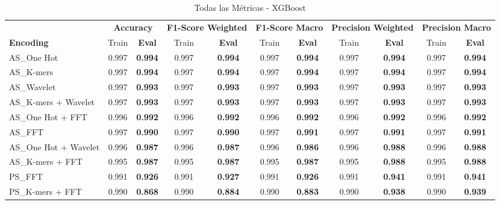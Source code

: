 \begin{table*}[htbp]
\centering
\caption{Todas las Métricas - XGBoost}
\label{tab:xgboost_complete}
\scriptsize
\begin{tabular}{lcccccccccc}
\toprule
& \multicolumn{2}{c}{\textbf{Accuracy}} & \multicolumn{2}{c}{\textbf{F1-Score Weighted}} & \multicolumn{2}{c}{\textbf{F1-Score Macro}} & \multicolumn{2}{c}{\textbf{Precision Weighted}} & \multicolumn{2}{c}{\textbf{Precision Macro}} \\
\cmidrule(lr){2-3} \cmidrule(lr){4-5} \cmidrule(lr){6-7} \cmidrule(lr){8-9} \cmidrule(lr){10-11}
\textbf{Encoding} & Train & \textbf{Eval} & Train & \textbf{Eval} & Train & \textbf{Eval} & Train & \textbf{Eval} & Train & \textbf{Eval} \\
\midrule
AS\_One Hot & 0.997 & \textbf{0.994} & 0.997 & \textbf{0.994} & 0.997 & \textbf{0.994} & 0.997 & \textbf{0.994} & 0.997 & \textbf{0.994} \\
AS\_K-mers & 0.997 & \textbf{0.994} & 0.997 & \textbf{0.994} & 0.997 & \textbf{0.994} & 0.997 & \textbf{0.994} & 0.997 & \textbf{0.994} \\
AS\_Wavelet & 0.997 & \textbf{0.993} & 0.997 & \textbf{0.993} & 0.997 & \textbf{0.993} & 0.997 & \textbf{0.993} & 0.997 & \textbf{0.993} \\
AS\_K-mers + Wavelet & 0.997 & \textbf{0.993} & 0.997 & \textbf{0.993} & 0.997 & \textbf{0.993} & 0.997 & \textbf{0.993} & 0.997 & \textbf{0.993} \\
AS\_One Hot + FFT & 0.996 & \textbf{0.992} & 0.996 & \textbf{0.992} & 0.996 & \textbf{0.992} & 0.996 & \textbf{0.992} & 0.996 & \textbf{0.992} \\
AS\_FFT & 0.997 & \textbf{0.990} & 0.997 & \textbf{0.990} & 0.997 & \textbf{0.991} & 0.997 & \textbf{0.991} & 0.997 & \textbf{0.991} \\
AS\_One Hot + Wavelet & 0.996 & \textbf{0.987} & 0.996 & \textbf{0.987} & 0.996 & \textbf{0.986} & 0.996 & \textbf{0.988} & 0.996 & \textbf{0.988} \\
AS\_K-mers + FFT & 0.995 & \textbf{0.987} & 0.995 & \textbf{0.987} & 0.995 & \textbf{0.987} & 0.995 & \textbf{0.988} & 0.995 & \textbf{0.988} \\
PS\_FFT & 0.991 & \textbf{0.926} & 0.991 & \textbf{0.927} & 0.991 & \textbf{0.926} & 0.991 & \textbf{0.941} & 0.991 & \textbf{0.941} \\
PS\_K-mers + FFT & 0.990 & \textbf{0.868} & 0.990 & \textbf{0.884} & 0.990 & \textbf{0.883} & 0.990 & \textbf{0.938} & 0.990 & \textbf{0.939} \\

\end{tabular}
\end{table*}
